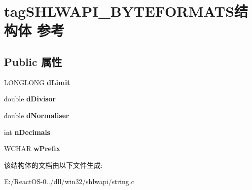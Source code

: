 \hypertarget{structtag_s_h_l_w_a_p_i___b_y_t_e_f_o_r_m_a_t_s}{}\section{tag\+S\+H\+L\+W\+A\+P\+I\+\_\+\+B\+Y\+T\+E\+F\+O\+R\+M\+A\+T\+S结构体 参考}
\label{structtag_s_h_l_w_a_p_i___b_y_t_e_f_o_r_m_a_t_s}
\subsection*{Public 属性}
\begin{DoxyCompactItemize}
\item 
\mbox{\label{structtag_s_h_l_w_a_p_i___b_y_t_e_f_o_r_m_a_t_s_aab6771980fedf5de35f194ed8fb1f281}} 
L\+O\+N\+G\+L\+O\+NG {\bfseries d\+Limit}
\item 
\mbox{\label{structtag_s_h_l_w_a_p_i___b_y_t_e_f_o_r_m_a_t_s_a1a78f96bc1061c2bcfa83d5fb43460ff}} 
double {\bfseries d\+Divisor}
\item 
\mbox{\label{structtag_s_h_l_w_a_p_i___b_y_t_e_f_o_r_m_a_t_s_a0340fe8aee60255e35b9660a9babaada}} 
double {\bfseries d\+Normaliser}
\item 
\mbox{\label{structtag_s_h_l_w_a_p_i___b_y_t_e_f_o_r_m_a_t_s_af8a47202605a301432be368c4b4762f0}} 
int {\bfseries n\+Decimals}
\item 
\mbox{\label{structtag_s_h_l_w_a_p_i___b_y_t_e_f_o_r_m_a_t_s_a1202b9c609d053a8611ff0ed3dfc6ba9}} 
W\+C\+H\+AR {\bfseries w\+Prefix}
\end{DoxyCompactItemize}


该结构体的文档由以下文件生成\+:\begin{DoxyCompactItemize}
\item 
E\+:/\+React\+O\+S-\/0../dll/win32/shlwapi/string.\+c\end{DoxyCompactItemize}

